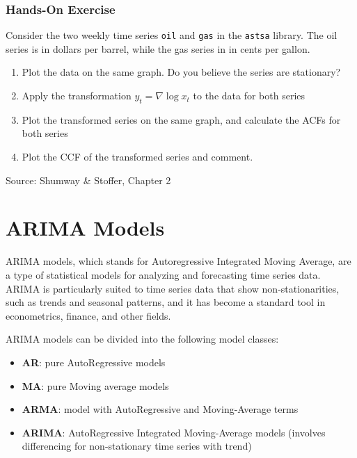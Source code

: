 \begin{tcolorbox}[colback=code]
\subsubsection*{Hands-On Exercise} 
Consider the two weekly time series \texttt{oil} and \texttt{gas} in the  \texttt{astsa} library. The oil series is in dollars per barrel, while the gas series in in cents per gallon.
\begin{enumerate}
   \item Plot the data on the same graph. Do you believe the series are stationary?
   \item Apply the transformation $y_t = \nabla \log x_t$ to the data for both series
   \item Plot the transformed series on the same graph, and calculate the ACFs for both series
   \item Plot the CCF of the transformed series and comment.
\end{enumerate}

{\footnotesize \vspace{\baselineskip} Source: Shumway \& Stoffer, Chapter 2}
\end{tcolorbox}

\section{ARIMA Models}

ARIMA models, which stands for Autoregressive Integrated Moving Average, are a type of statistical models for analyzing and forecasting time series data. ARIMA is particularly suited to time series data that show non-stationarities, such as trends and seasonal patterns, and it has become a standard tool in econometrics, finance, and other fields.

ARIMA models can be divided into the following model classes:
\begin{itemize}
  \item \textbf{AR}: pure AutoRegressive models
  \item \textbf{MA}: pure Moving average models
  \item \textbf{ARMA}: model with AutoRegressive and Moving-Average terms
  \item \textbf{ARIMA}: AutoRegressive Integrated Moving-Average models (involves differencing for non-stationary time series with trend)
\end{itemize}

